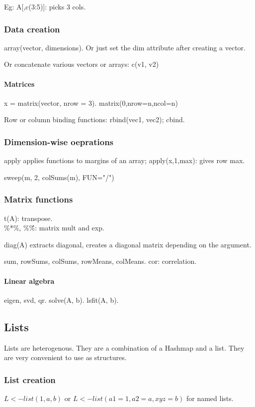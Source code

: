 Eg: A[,c(3:5)]: picks 3 cols.

\subsubsection{Data creation}
array(vector, dimensions). Or just set the dim attribute after creating a vector.

Or concatenate various vectors or arrays: c(v1, v2)

\paragraph{Matrices}
x = matrix(vector, nrow = 3).
matrix(0,nrow=n,ncol=n)

Row or column binding functions: rbind(vec1, vec2); cbind.

\subsubsection{Dimension-wise oeprations}
apply applies functions to margins of an array; apply(x,1,max): gives row max.

sweep(m, 2, colSums(m), FUN="/")

\subsubsection{Matrix functions}
t(A): transpose.\\
\%*\%, \%\^\%: matrix mult and exp.

diag(A) extracts diagonal, creates a diagonal matrix depending on the argument.

sum, rowSums, colSums, rowMeans, colMeans. cor: correlation.

\paragraph{Linear algebra}
eigen, svd, qr. solve(A, b). lsfit(A, b).

\subsection{Lists}
Lists are heterogenous. They are a combination of a Hashmap and a list. They are very convenient to use as structures.

\subsubsection{List creation}
$L <-list(1, a, b)$ or $L <-list(a1= 1, a2 = a, xyz = b)$ for named lists.

